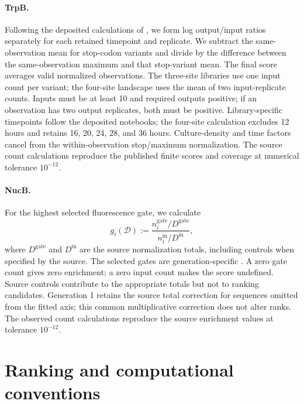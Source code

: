 \documentclass[11pt]{article}
\newcommand{\data}{\mathcal{D}}
\begin{document}
\paragraph{TrpB.}
Following the deposited calculations of \citet{johnston2024}, we form log
output/input ratios separately for each retained timepoint and replicate.
We subtract the same-observation mean for stop-codon variants and divide by
the difference between the same-observation maximum and that stop-variant
mean. The final score averages valid normalized observations. The three-site
libraries use one input count per variant; the four-site landscape uses the
mean of two input-replicate counts. Inputs must be at least 10 and required
outputs positive; if an observation has two output replicates, both must be
positive. Library-specific timepoints follow the deposited notebooks; the
four-site calculation excludes 12 hours and retains 16, 20, 24, 28, and
36 hours. Culture-density and time factors cancel from the within-observation
stop/maximum normalization. The source count calculations reproduce the
published finite scores and coverage at numerical tolerance $10^{-12}$.

\paragraph{NucB.}
For the highest selected fluorescence gate, we calculate
\[
g_i(\data):=\frac{n_i^{\mathrm{gate}}/D^{\mathrm{gate}}}
{n_i^{\mathrm{in}}/D^{\mathrm{in}}},
\]
where $D^{\mathrm{gate}}$ and $D^{\mathrm{in}}$ are the source normalization
totals, including controls when specified by the source. The selected gates
are generation-specific \citep{thomas2025}. A zero gate count gives zero
enrichment; a zero input count makes the score undefined. Source controls
contribute to the appropriate totals but not to ranking candidates. Generation
1 retains the source total correction for sequences omitted from the fitted
axis; this common multiplicative correction does not alter ranks. The observed
count calculations reproduce the source enrichment values at tolerance
$10^{-12}$.

\section{Ranking and computational conventions}
\label{app:computation}
\end{document}
